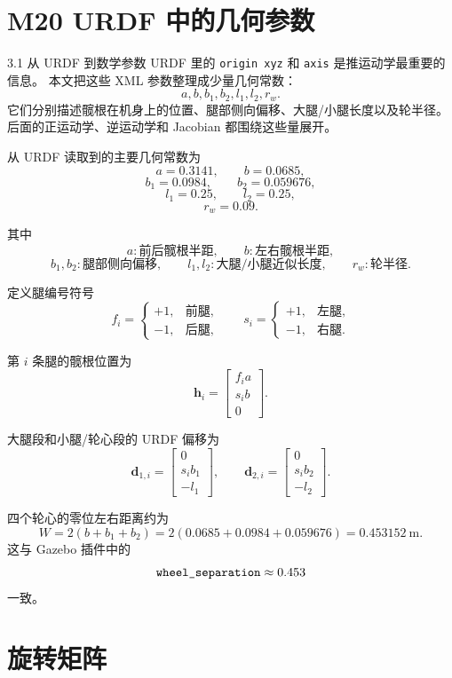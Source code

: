 \documentclass[UTF8,11pt,a4paper]{ctexart}
\newcommand{\bs}[1]{\bm{#1}}
\begin{document}
\section{M20 URDF 中的几何参数}

\begin{greenbox}{3.1 从 URDF 到数学参数}
URDF 里的 \texttt{origin xyz} 和 \texttt{axis} 是推运动学最重要的信息。
本文把这些 XML 参数整理成少量几何常数：
\[
a,b,b_1,b_2,l_1,l_2,r_w.
\]
它们分别描述髋根在机身上的位置、腿部侧向偏移、大腿/小腿长度以及轮半径。
后面的正运动学、逆运动学和 Jacobian 都围绕这些量展开。
\end{greenbox}

从 URDF 读取到的主要几何常数为
\[
a = 0.3141,\qquad b=0.0685,
\]
\[
b_1 = 0.0984,\qquad b_2 = 0.059676,
\]
\[
l_1 = 0.25,\qquad l_2 = 0.25,
\]
\[
r_w = 0.09.
\]

其中
\[
a:\text{前后髋根半距}, \qquad
b:\text{左右髋根半距},
\]
\[
b_1,b_2:\text{腿部侧向偏移}, \qquad
l_1,l_2:\text{大腿/小腿近似长度}, \qquad
r_w:\text{轮半径}.
\]

定义腿编号符号
\[
f_i =
\begin{cases}
+1, & \text{前腿},\\
-1, & \text{后腿},
\end{cases}
\qquad
s_i =
\begin{cases}
+1, & \text{左腿},\\
-1, & \text{右腿}.
\end{cases}
\]

第 \(i\) 条腿的髋根位置为
\[
\bs h_i =
\begin{bmatrix}
f_i a\\
s_i b\\
0
\end{bmatrix}.
\]

大腿段和小腿/轮心段的 URDF 偏移为
\[
\bs d_{1,i} =
\begin{bmatrix}
0\\
s_i b_1\\
-l_1
\end{bmatrix},
\qquad
\bs d_{2,i} =
\begin{bmatrix}
0\\
s_i b_2\\
-l_2
\end{bmatrix}.
\]

四个轮心的零位左右距离约为
\[
W =
2(b+b_1+b_2)
= 2(0.0685+0.0984+0.059676)
=0.453152\ \mathrm m.
\]
这与 Gazebo 插件中的
\[
\text{\texttt{wheel\_separation}} \approx 0.453
\]
一致。

\section{旋转矩阵}
\end{document}

